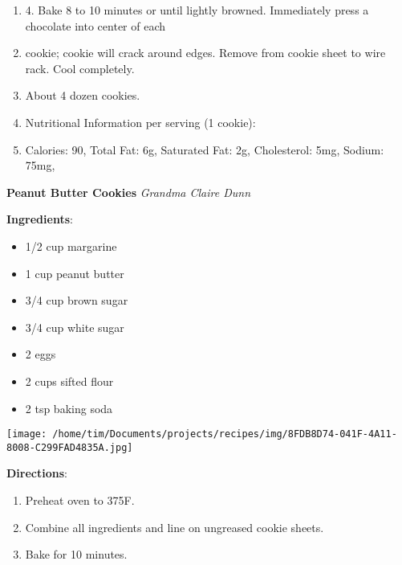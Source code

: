 \documentclass[11pt, twoside, openany]{book}
\begin{document}
\begin{minipage}[t]{\linewidth}
\begin{enumerate}
\item 4. Bake 8 to 10 minutes or until lightly browned. Immediately press a chocolate into center of each
\item cookie; cookie will crack around edges. Remove from cookie sheet to wire rack. Cool completely.
\item About 4 dozen cookies.
\item Nutritional Information per serving (1 cookie):
\item Calories: 90, Total Fat: 6g, Saturated Fat: 2g, Cholesterol: 5mg, Sodium: 75mg,
\end{enumerate}
\end{minipage}\vspace{8mm}
\noindent\begin{minipage}[t]{\linewidth}%
{\Large\textbf{Peanut Butter Cookies}} \label{peanut-butter-cookies}\hfill\textit{Grandma Claire Dunn}\\
\noindent\begin{minipage}[t]{0.78\linewidth}%
\textbf{Ingredients}:\vspace{-3mm}
\begin{multicols}{2}
\begin{itemize}\setlength\itemsep{-1mm}
\item 1/2 cup margarine
\item 1 cup peanut butter
\item 3/4 cup brown sugar
\item 3/4 cup white sugar
\item 2 eggs
\item 2 cups sifted flour
\item 2 tsp baking soda
\end{itemize}
\end{multicols}
\end{minipage}
\noindent\begin{minipage}[t]{0.18\linewidth}
\centering \strut\vspace*{-\baselineskip}\newline
\texttt{[image: /home/tim/Documents/projects/recipes/img/8FDB8D74-041F-4A11-8008-C299FAD4835A.jpg]}\\
\end{minipage}\vspace{3mm}
\textbf{Directions}:
\vspace{-3mm}\begin{enumerate}\setlength\itemsep{-1mm}
\item Preheat oven to 375F.
\item Combine all ingredients and line on ungreased cookie sheets.
\item Bake for 10 minutes.
\end{enumerate}
\end{minipage}\vspace{8mm}
\end{document}
